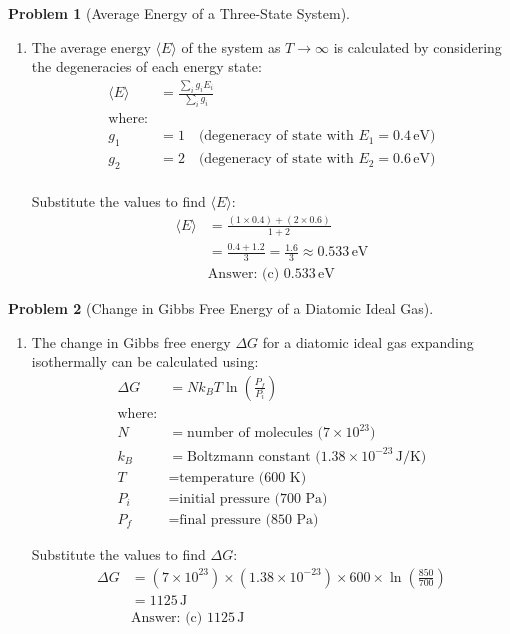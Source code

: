 \documentclass[12pt]{article}
\theoremstyle{definition} %
\newtheorem{problem}{Problem}
\theoremstyle{plain} %
\begin{document}
\begin{problem}[Average Energy of a Three-State System]
    \noindent
    \begin{enumerate}
        \item 
        The average energy \( \langle E \rangle \) of the system as \( T \to \infty \) is calculated by considering the degeneracies of each energy state:
        \begin{align*}
        \langle E \rangle &= \frac{\sum_i g_i E_i}{\sum_i g_i} \\
        \text{where:} \\
        g_1 &= 1 \quad \text{(degeneracy of state with } E_1 = 0.4 \, \text{eV)} \\
        g_2 &= 2 \quad \text{(degeneracy of state with } E_2 = 0.6 \, \text{eV)} \\
        \end{align*}

        Substitute the values to find \( \langle E \rangle \):
        \begin{align*}
        \langle E \rangle &= \frac{(1 \times 0.4) + (2 \times 0.6)}{1 + 2} \\
        &= \frac{0.4 + 1.2}{3} = \frac{1.6}{3} \approx 0.533 \, \text{eV} \\
        &\text{Answer: (c) } 0.533 \, \text{eV}
        \end{align*}
    \end{enumerate}
\end{problem}
\begin{problem}[Change in Gibbs Free Energy of a Diatomic Ideal Gas]
    \noindent
    \begin{enumerate}
        \item 
        The change in Gibbs free energy \( \Delta G \) for a diatomic ideal gas expanding isothermally can be calculated using:
        \begin{align*}
        \Delta G &= N k_B T \ln \left( \frac{P_f}{P_i} \right) \\
        \text{where:} \\
        N &= \text{number of molecules (} 7 \times 10^{23} \text{)} \\
        k_B &= \text{Boltzmann constant (} 1.38 \times 10^{-23} \, \text{J/K)} \\
        T &= \text{temperature (600 K)} \\
        P_i &= \text{initial pressure (700 Pa)} \\
        P_f &= \text{final pressure (850 Pa)}
        \end{align*}

        Substitute the values to find \( \Delta G \):
        \begin{align*}
        \Delta G &= (7 \times 10^{23}) \times (1.38 \times 10^{-23}) \times 600 \times \ln \left( \frac{850}{700} \right) \\
        &= 1125 \, \text{J} \\
        &\text{Answer: (c) } 1125 \, \text{J}
        \end{align*}
    \end{enumerate}
\end{problem}
\end{document}

